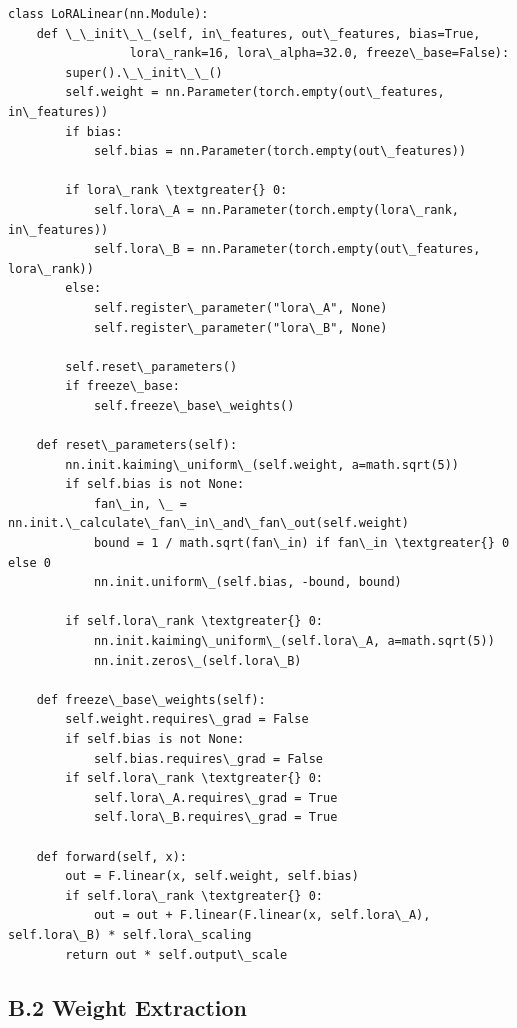 \begin{lstlisting}
class LoRALinear(nn.Module):
    def \_\_init\_\_(self, in\_features, out\_features, bias=True,
                 lora\_rank=16, lora\_alpha=32.0, freeze\_base=False):
        super().\_\_init\_\_()
        self.weight = nn.Parameter(torch.empty(out\_features, in\_features))
        if bias:
            self.bias = nn.Parameter(torch.empty(out\_features))
        
        if lora\_rank \textgreater{} 0:
            self.lora\_A = nn.Parameter(torch.empty(lora\_rank, in\_features))
            self.lora\_B = nn.Parameter(torch.empty(out\_features, lora\_rank))
        else:
            self.register\_parameter("lora\_A", None)
            self.register\_parameter("lora\_B", None)
        
        self.reset\_parameters()
        if freeze\_base:
            self.freeze\_base\_weights()
    
    def reset\_parameters(self):
        nn.init.kaiming\_uniform\_(self.weight, a=math.sqrt(5))
        if self.bias is not None:
            fan\_in, \_ = nn.init.\_calculate\_fan\_in\_and\_fan\_out(self.weight)
            bound = 1 / math.sqrt(fan\_in) if fan\_in \textgreater{} 0 else 0
            nn.init.uniform\_(self.bias, -bound, bound)
        
        if self.lora\_rank \textgreater{} 0:
            nn.init.kaiming\_uniform\_(self.lora\_A, a=math.sqrt(5))
            nn.init.zeros\_(self.lora\_B)
    
    def freeze\_base\_weights(self):
        self.weight.requires\_grad = False
        if self.bias is not None:
            self.bias.requires\_grad = False
        if self.lora\_rank \textgreater{} 0:
            self.lora\_A.requires\_grad = True
            self.lora\_B.requires\_grad = True
    
    def forward(self, x):
        out = F.linear(x, self.weight, self.bias)
        if self.lora\_rank \textgreater{} 0:
            out = out + F.linear(F.linear(x, self.lora\_A), self.lora\_B) * self.lora\_scaling
        return out * self.output\_scale
\end{lstlisting}

\subsection{B.2 Weight Extraction}

